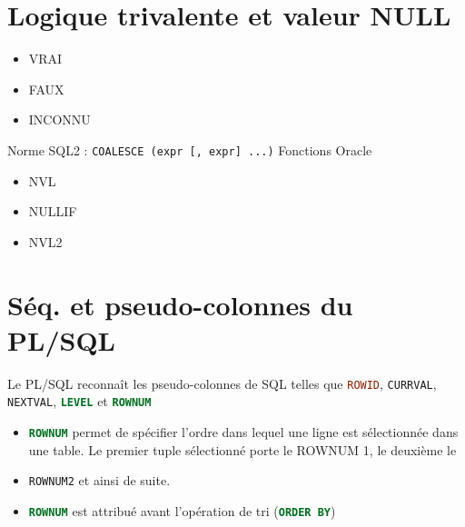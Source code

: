 \documentclass[10pt]{beamer}
\begin{document}
\section{Logique trivalente et valeur NULL}
\begin{frame}{\secname}
    \begin{itemize}
        \item VRAI
        \item FAUX
        \item INCONNU
    \end{itemize}
\end{frame}

\begin{frame}{\secname}
    Norme SQL2 : \lstinline[language=bnf]!COALESCE (expr [, expr] ...)!
    Fonctions Oracle
    \begin{itemize}
        \item NVL
        \item NULLIF
        \item NVL2
    \end{itemize}
\end{frame}
\section{Séq. et pseudo-colonnes du PL/SQL}
\begin{frame}{\secname}
    Le PL/SQL reconnaît les pseudo-colonnes de SQL telles que \lstinline[language=sql]!ROWID!, \lstinline[language=sql]!CURRVAL!, \lstinline[language=sql]!NEXTVAL!, \lstinline[language=sql]!LEVEL! et \lstinline[language=sql]!ROWNUM!
    
\end{frame}

\begin{frame}{\secname}
    
\end{frame}

\begin{frame}{\secname}
    \begin{itemize}
        \item \lstinline[language=sql]!ROWNUM! permet de spécifier l'ordre dans lequel une ligne est sélectionnée dans une table.  Le premier tuple sélectionné porte le ROWNUM 1, le deuxième le
        \item \lstinline[language=sql]!ROWNUM2! et ainsi de suite.
        \item \lstinline[language=sql]!ROWNUM! est attribué avant l'opération de tri (\lstinline[language=sql]!ORDER BY!)
    \end{itemize}
\end{frame}

\begin{frame}{\secname}
    
\end{frame}

\begin{frame}{\secname}
    
\end{frame}
\end{document}
